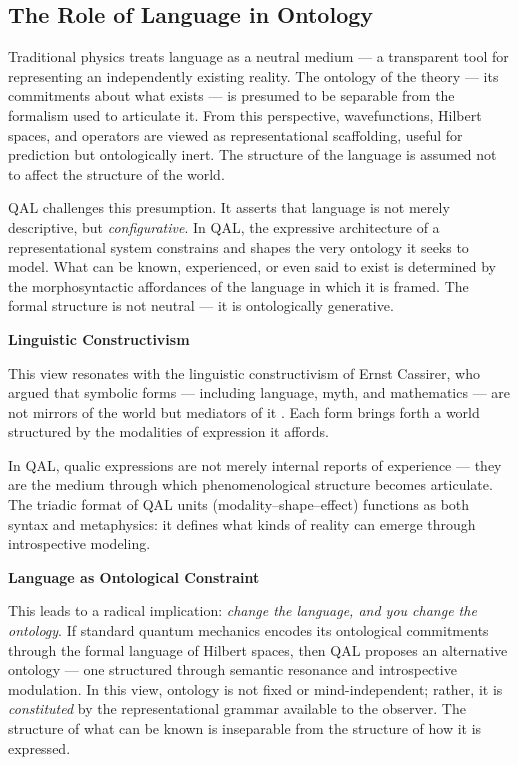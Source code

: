 \documentclass[11pt]{article}
\numberwithin{equation}{section} %
\begin{document}
\subsection{The Role of Language in Ontology}

Traditional physics treats language as a neutral medium — a transparent tool for representing an independently existing reality. The ontology of the theory — its commitments about what exists — is presumed to be separable from the formalism used to articulate it. From this perspective, wavefunctions, Hilbert spaces, and operators are viewed as representational scaffolding, useful for prediction but ontologically inert. The structure of the language is assumed not to affect the structure of the world.

QAL challenges this presumption. It asserts that language is not merely descriptive, but \textit{configurative}. In QAL, the expressive architecture of a representational system constrains and shapes the very ontology it seeks to model. What can be known, experienced, or even said to exist is determined by the morphosyntactic affordances of the language in which it is framed. The formal structure is not neutral — it is ontologically generative.

\bigskip

\noindent\textbf{Linguistic Constructivism}

This view resonates with the linguistic constructivism of Ernst Cassirer, who argued that symbolic forms — including language, myth, and mathematics — are not mirrors of the world but mediators of it \cite{cassirer1955philosophy}. Each form brings forth a world structured by the modalities of expression it affords.

In QAL, qualic expressions are not merely internal reports of experience — they are the medium through which phenomenological structure becomes articulate. The triadic format of QAL units (modality–shape–effect) functions as both syntax and metaphysics: it defines what kinds of reality can emerge through introspective modeling.

\bigskip

\noindent\textbf{Language as Ontological Constraint}

This leads to a radical implication: \textit{change the language, and you change the ontology}. If standard quantum mechanics encodes its ontological commitments through the formal language of Hilbert spaces, then QAL proposes an alternative ontology — one structured through semantic resonance and introspective modulation. In this view, ontology is not fixed or mind-independent; rather, it is \textit{constituted} by the representational grammar available to the observer. The structure of what can be known is inseparable from the structure of how it is expressed.
\end{document}
